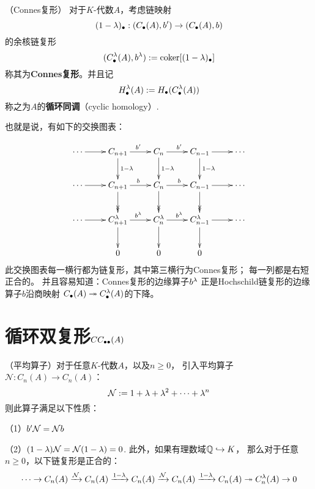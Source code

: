 \begin{definition}（Connes复形）
对于$K$-代数$A$，考虑链映射
$$(1-\lambda)_{\bullet}:(C_{\bullet}(A),b')\to(C_{\bullet}(A),b)$$
的余核链复形
$$(C_{\bullet}^{\lambda}(A),b^{\lambda}):=\operatorname{coker}[(1-\lambda)_{\bullet}]$$
称其为\textbf{Connes复形}。并且记
$$H^{\lambda}_{\bullet}(A):=H_{\bullet}(C_{\bullet}^{\lambda}(A))$$
称之为$A$的\textbf{循环同调}（cyclic homology）.
\end{definition}

也就是说，有如下的交换图表：

$$\xymatrix{
     \cdots \ar[r]
   & C_{n+1}\ar[r]^{b'}  \ar[d]^{1-\lmd}
   & C_{n  }\ar[r]^{b'}  \ar[d]^{1-\lmd}
   & C_{n-1}\ar[r]       \ar[d]^{1-\lmd}
   & \cdots
\\
     \cdots \ar[r]
   & C_{n+1}\ar[r]^{b }  \ar@{->>}[d]
   & C_{n  }\ar[r]^{b }  \ar@{->>}[d]
   & C_{n-1}\ar[r]       \ar@{->>}[d]
   & \cdots
\\
     \cdots \ar[r]
   & C_{n+1}^{\lmd}\ar[r]^{b^{\lmd}} \ar[d]
   & C_{n  }^{\lmd}\ar[r]^{b^{\lmd}} \ar[d]
   & C_{n-1}^{\lmd}\ar[r]            \ar[d]
   & \cdots
\\
   &0
   &0
   &0
   &
}$$
此交换图表每一横行都为链复形，其中第三横行为Connes复形；
每一列都是右短正合的。
并且容易知道：Connes复形的边缘算子$b^{\lambda}$
正是Hochschild链复形的边缘算子$b$沿商映射
$C_{\bullet}(A)\twoheadrightarrow C^{\lambda}_{\bullet}(A)$的下降。


\section{循环双复形$CC_{\bullet\bullet}(A)$}

\begin{lemma}（平均算子）对于任意$K$-代数$A$，以及$n\geq 0$，
引入平均算子$\mathcal{N}:C_n(A)\to C_n(A)$：
$$\mathcal{N}:=1+\lambda+\lambda^2+\cdots+\lambda^n$$
则此算子满足以下性质：

（1）$b'\mathcal{N}=\mathcal{N} b$

（2）$(1-\lambda)\mathcal{N}=\mathcal{N}(1-\lambda)=0$.
此外，如果有理数域$\mathbb{Q}\hookrightarrow K$，
那么对于任意$n\geq 0$，以下链复形是正合的：
$$\cdots\to
C_n(A)\xrightarrow{\mathcal{N}}C_n(A)\xrightarrow{1-\lambda}
C_n(A)\xrightarrow{\mathcal{N}}C_n(A)\xrightarrow{1-\lambda}
C_n(A)\twoheadrightarrow C_n^{\lambda}(A)\to 0
$$
\label{循环双复形的行正合性-lemma}
\end{lemma}

